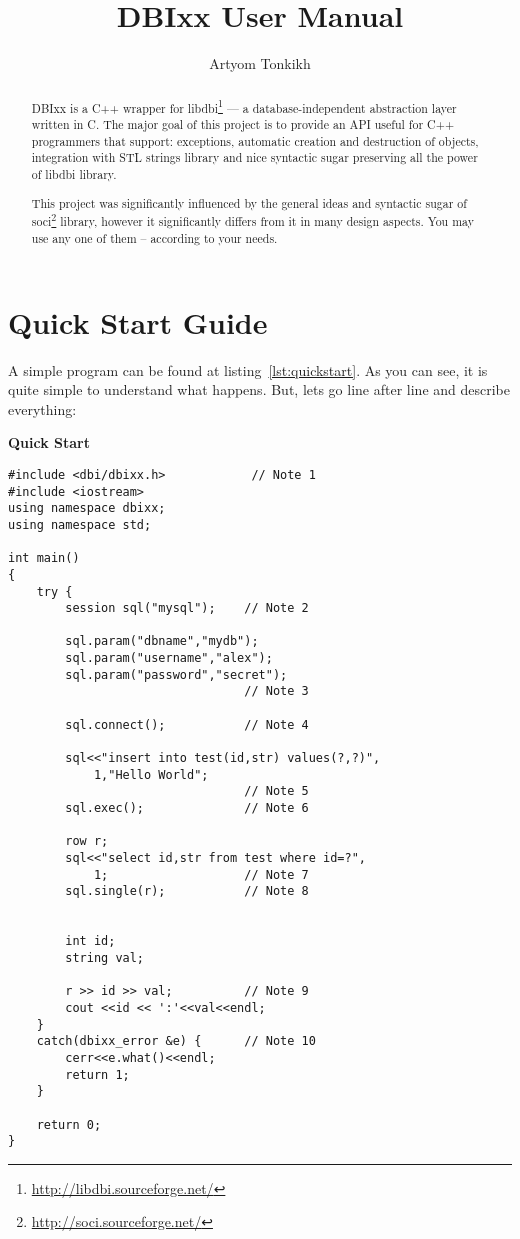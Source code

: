\documentclass[11pt]{article}
\title{DBIxx User Manual}
\author{Artyom Tonkikh}
\renewcommand{\caption}[1]{\textbf{#1}}
\begin{document}
\maketitle
\tableofcontents

\begin{abstract}
DBIxx is a C++ wrapper for libdbi\footnote{\url{http://libdbi.sourceforge.net/}} --- a database-independent abstraction layer written in C. The major goal of this project is to provide an API useful for C++ programmers that support: exceptions, automatic creation and destruction of objects, integration with STL strings library and nice syntactic sugar preserving all the power of libdbi library.

This project was significantly influenced by the general ideas and syntactic sugar of soci\footnote{\url{http://soci.sourceforge.net/}} library, however it significantly differs from it in many design aspects. You may use any one of them -- according to your needs.
\end{abstract}
\section{Quick Start Guide}

A simple program can be found at listing~\ref{lst:quickstart}. As you can see, it is quite simple to understand what happens. But, lets go line after line and describe everything:

\begin{program}
\caption{Quick Start\label{lst:quickstart}}
\begin{verbatim}
#include <dbi/dbixx.h>            // Note 1
#include <iostream>              
using namespace dbixx;
using namespace std;

int main()
{
    try {
        session sql("mysql");    // Note 2

        sql.param("dbname","mydb");
        sql.param("username","alex");
        sql.param("password","secret");
                                 // Note 3

        sql.connect();           // Note 4
    
        sql<<"insert into test(id,str) values(?,?)",
            1,"Hello World";
                                 // Note 5
        sql.exec();              // Note 6

        row r;
        sql<<"select id,str from test where id=?",
            1;                   // Note 7
        sql.single(r);           // Note 8


        int id;
        string val;

        r >> id >> val;          // Note 9
        cout <<id << ':'<<val<<endl;
    }
    catch(dbixx_error &e) {      // Note 10
        cerr<<e.what()<<endl;
        return 1;
    }

    return 0;
}
\end{verbatim}
\end{program}
\end{document}

